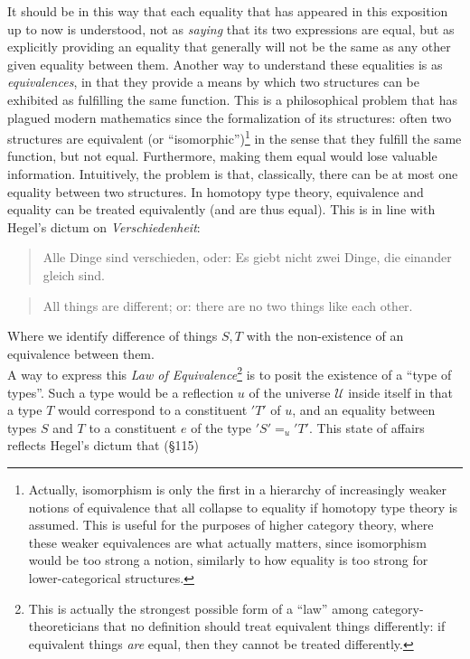 \documentclass{article}
\begin{document}
It should be in this way that each equality that has appeared in this exposition up to now is understood,
not as \emph{saying} that its two expressions are equal, but as explicitly providing an equality that
generally will not be the same as any other given equality between them. Another way to understand these
equalities is as \emph{equivalences}, in that they provide a means by which two structures can be exhibited
as fulfilling the same function. This is a philosophical problem that has plagued modern mathematics since
the formalization of its structures: often two structures are equivalent (or ``isomorphic'')\footnote{Actually,
isomorphism is only the first in a hierarchy of increasingly weaker notions of equivalence that all collapse
to equality if homotopy type theory is assumed. This is useful for the purposes of higher category theory,
where these weaker equivalences are what actually matters, since isomorphism would be too strong a notion,
similarly to how equality is too strong for lower-categorical structures.} in the sense that they fulfill
the same function, but not equal. Furthermore, making them equal would lose valuable information. Intuitively,
the problem is that, classically, there can be at most one equality between two structures. In homotopy
type theory, equivalence and equality can be treated equivalently (and are thus equal). This is in line
with Hegel's dictum on \emph{Verschiedenheit}:

\begin{quote}
   Alle Dinge sind verschieden, oder: Es giebt nicht zwei Dinge, die einander gleich sind.
\end{quote}

\begin{quote}
    All things are different; or: there are no two things like each other.
\end{quote}

Where we identify difference of things $S,T$ with the non-existence of an equivalence between them. \\

A way to express this \emph{Law of Equivalence}\footnote{This is actually the strongest possible form
of a ``law'' among category-theoreticians that no definition should treat equivalent things differently:
if equivalent things \emph{are} equal, then they cannot be treated differently.} is to posit the existence
of a ``type of types''. Such a type would be a reflection $u$ of the universe $\mathcal{U}$ inside
itself in that a type $T$ would correspond to a constituent $'T'$ of $u$, and an equality between
types $S$ and $T$ to a constituent $e$ of the type $'S'=_{u} 'T'$. This state of affairs reflects
Hegel's dictum that (§115)
\end{document}
